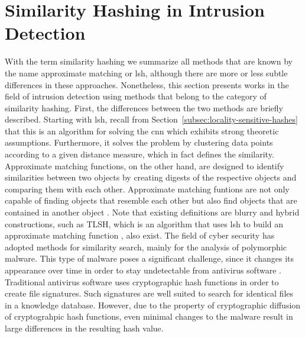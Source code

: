 \documentclass[../../main.tex]{subfiles}
\begin{document}
\section{Similarity Hashing in Intrusion Detection}\label{sec:similarity_hashing_intrusion_detection}

With the term similarity hashing we summarize all methods that are known by the name approximate matching or \gls{lsh}, although there are more or less subtle differences in these approaches. Nonetheless, this section presents works in the field of intrusion detection using methods that belong to the category of similarity hashing. First, the differences between the two methods are briefly described. Starting with \gls{lsh}, recall from Section~\ref{subsec:locality-sensitive-hashes} that this is an algorithm for solving the \gls{cnn} which exhibits strong theoretic assumptions. Furthermore, it solves the problem by clustering data points according to a given distance measure, which in fact defines the similarity. Approximate matching functions, on the other hand, are designed to identify similarities between two objects by creating digests of the respective objects and comparing them with each other. Approximate matching funtions are not only capable of finding objects that resemble each other but also find objects that are contained in another object \cite{breitinger2014approximate}. Note that existing definitions are blurry and hybrid constructions, such as TLSH, which is an algorithm that uses \gls{lsh} to build an approximate matching function \cite{oliver2013tlsh}, also exist. The field of cyber security has adopted methods for similarity search, mainly for the analysis of polymorphic malware. This type of malware poses a significant challenge, since it changes its appearance over time in order to stay undetectable from antivirus software \cite[p.91]{whitman_principles_2018}. Traditional antivirus software uses cryptographic hash functions in order to create file signatures. Such signatures are well suited to search for identical files in a knowledge database. However, due to the property of cryptographic diffusion of cryptograhpic hash functions, even minimal changes to the malware result in large differences in the resulting hash value. 
\end{document}
